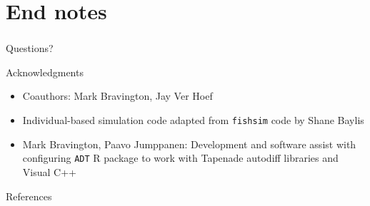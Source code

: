 \documentclass[serif,mathserif]{beamer}
\begin{document}
 \section{End notes}
  \begin{frame}
  \frametitle{}
  {\Huge Questions?}

  \vspace{0.5cm}

  \textcolor{noaaturq}{Acknowledgments} \\
  \begin{itemize}
  \item Coauthors: Mark Bravington, Jay Ver Hoef
  \item Individual-based simulation code adapted from \texttt{fishsim} code by Shane Baylis
  \item Mark Bravington, Paavo Jumppanen: Development and software assist with configuring \texttt{ADT} R package to work with Tapenade autodiff libraries and Visual C++
  \end{itemize}
  \vspace{0.5cm}
   \textcolor{noaaturq}{References}
 
 {\tiny
  }

 \end{frame}
\end{document}
